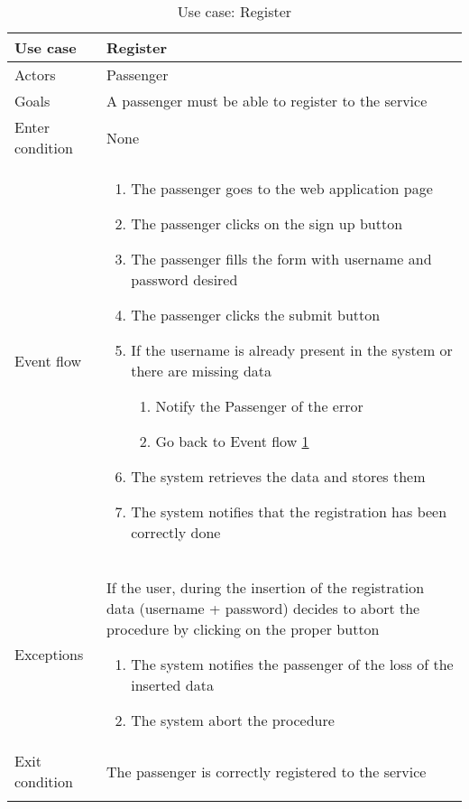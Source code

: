\begin{center}
\centering
\begin{longtable}{| p{} | p{} |} \hline
Use case & \textbf{Register} \\ \hline 
Actors & Passenger \\ \hline
Goals & A passenger must be able to register to the service \\ \hline
Enter condition & None \\ \hline
Event flow & \begin{enumerate}
				\item The passenger goes to the web application page
				\item The passenger clicks on the sign up button
				\item \label{fillForm1} The passenger fills the form with username and password desired
				\item The passenger clicks the submit button
				\item If the username is already present in the system or there are missing data
				\begin{enumerate}
					\item Notify the Passenger of the error
					\item Go back to Event flow \ref{fillForm1}
				\end{enumerate}	
				\item The system retrieves the data and stores them
				\item The system notifies that the registration has been correctly done
			\end{enumerate} \\ \hline
Exceptions & If the user, during the insertion of the registration data (username + password) decides to abort the procedure by clicking on the proper button
			\begin{enumerate}
				\item The system notifies the passenger of the loss of the inserted data
				\item The system abort the procedure
			\end{enumerate}\\ \hline
Exit condition & The passenger is correctly registered to the service \\ \hline
\caption{Use case: Register}
\end{longtable}

\end{center}

